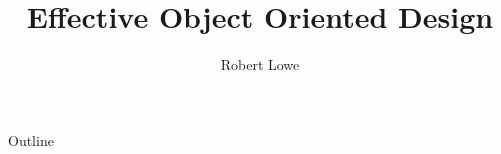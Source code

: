 \documentclass{beamer}
\title{Effective Object Oriented Design}
\author{Robert Lowe\\}
\institute[Maryville College] %
{
  Division of Mathematics and Computer Science\\
  Maryville College
}
\date[]{}
\begin{document}
\begin{frame}
  \titlepage
\end{frame}

\begin{frame}{Outline}
  \tableofcontents
\end{frame}




\end{document}
